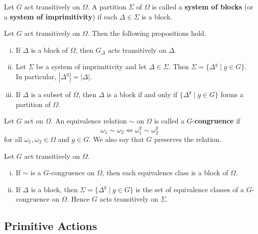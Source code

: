 \begin{definition}
	Let $G$ act transitively on $\Omega$. A partition $\Sigma$ of $\Omega$ is called a \textbf{system of blocks} (or a \textbf{system of imprimitivity}) if each $\Delta\in \Sigma$ is a block.
\end{definition}
\begin{proposition}
	Let $G$ act transitively on $\Omega$.  Then the following propositions hold.
	\begin{enumerate}[(i)]
		\item If $\Delta$ is a block of $\Omega$, then $G_{\Delta}$ acts transitively on $\Delta$. 
		\item Let $\Sigma$ be a system of imprimitivity and let $\Delta\in \Sigma$. Then
		$\Sigma  = \{\Delta^g\mid g\in G\}$. In particular, $|\Delta^g| = |\Delta|$.
		\item If $\Delta$ is a subset of $\Omega$, then $\Delta$ is a block if and only if $\{\Delta^g\mid g\in G\}$ forms a partition of $\Omega$.
	\end{enumerate}  
\end{proposition}
\begin{sketch}
	
\end{sketch}

\begin{definition}
	Let $G$ act on $\Omega$. An equivalence relation $\sim$ on $\Omega$ is called a $G$-\textbf{congruence} if  $$\omega_1 \sim \omega_2 \iff \omega_1^g \sim \omega_2^g$$ 
	for all $\omega_1,\omega_2\in \Omega$ and $g\in G$. We also say that $G$ preserves the relation.
\end{definition}
\begin{proposition}
	Let $G$ act transitively on $\Omega$.
	\begin{enumerate}[(i)]
		\item If $\sim$ is a $G$-congruence on $\Omega$, then each equivalence class is a block of $\Omega$.
		\item  If  $\Delta$ is a block, then $\Sigma = \{\Delta^g\mid g\in G\}$ is the set of equivalence classes of a $G$-congruence on $\Omega$. Hence $G$ acts transitively on $\Sigma$.
	\end{enumerate}
\end{proposition}
\begin{sketch}
	
\end{sketch}

\subsection{Primitive Actions}

